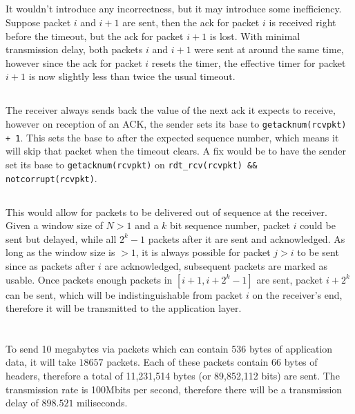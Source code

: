 \documentclass[12pt]{article}
\begin{document}
\subsection{}
It wouldn't introduce any incorrectness, but it may introduce some inefficiency.
Suppose packet $i$ and $i + 1$ are sent, then the ack for packet $i$ is received
right before the timeout, but the ack for packet $i + 1$ is lost.  With minimal
transmission delay, both packets $i$ and $i + 1$ were sent at around the same
time, however since the ack for packet $i$ resets the timer, the effective timer
for packet $i + 1$ is now slightly less than twice the usual timeout.

\subsection{}
The receiver always sends back the value of the next ack it expects to receive,
however on reception of an ACK, the sender sets its base to
\texttt{getacknum(rcvpkt) + 1}.  This sets the base to after the expected
sequence number, which means it will skip that packet when the timeout clears.
A fix would be to have the sender set its base to \texttt{getacknum(rcvpkt)} on
\texttt{rdt\_rcv(rcvpkt) \&\& notcorrupt(rcvpkt)}.

\subsection{}
This would allow for packets to be delivered out of sequence at the receiver.
Given a window size of $N > 1$ and a $k$ bit sequence number, packet $i$ could
be sent but delayed, while all $2^k - 1$ packets after it are sent and
acknowledged.  As long as the window size is $> 1$, it is always possible for
packet $j > i$ to be sent since as packets after $i$ are acknowledged,
subsequent packets are marked as usable.  Once packets enough packets in $[i +
1, i + 2^k - 1]$ are sent, packet $i + 2^k$ can be sent, which will be
indistinguishable from packet $i$ on the receiver's end, therefore it will be
transmitted to the application layer.


\section{}
To send 10 megabytes via packets which can contain 536 bytes of application
data, it will take $18657$ packets.  Each of these packets contain 66 bytes of
headers, therefore a total of 11,231,514 bytes (or 89,852,112 bits) are sent.
The transmission rate is 100Mbits per second, therefore there will be a
transmission delay of $898.521$ miliseconds.  
\end{document}
